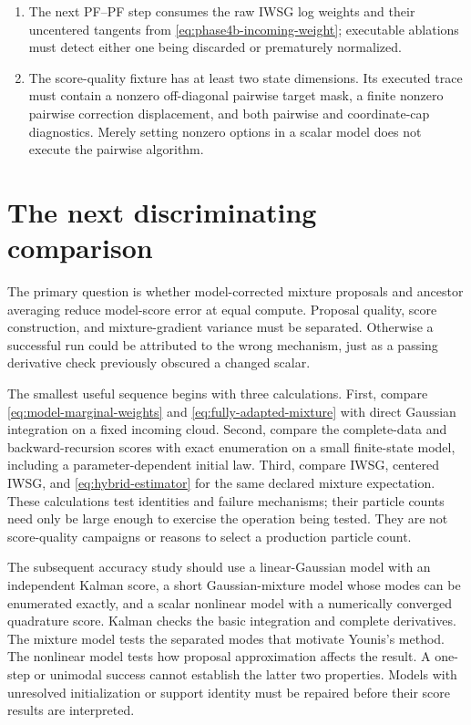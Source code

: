 \documentclass[11pt]{article}
\begin{document}
\begin{enumerate}[leftmargin=2em]
        evidence.
  \item The next PF--PF step consumes the raw IWSG log weights and their
        uncentered tangents from \eqref{eq:phase4b-incoming-weight}; executable
        ablations must detect either one being discarded or prematurely
        normalized.
  \item The score-quality fixture has at least two state dimensions.  Its
        executed trace must contain a nonzero off-diagonal pairwise target mask,
        a finite nonzero pairwise correction displacement, and both pairwise and
        coordinate-cap diagnostics.  Merely setting nonzero options in a scalar
        model does not execute the pairwise algorithm.
\end{enumerate}

\section{The next discriminating comparison}
\label{sec:next-study}

The primary question is whether model-corrected mixture proposals and
ancestor averaging reduce model-score error at equal compute. Proposal
quality, score construction, and mixture-gradient variance must be separated.
Otherwise a successful run could be attributed to the wrong mechanism, just
as a passing derivative check previously obscured a changed scalar.

The smallest useful sequence begins with three calculations. First, compare
\eqref{eq:model-marginal-weights} and
\eqref{eq:fully-adapted-mixture} with direct Gaussian integration on a fixed
incoming cloud. Second, compare the complete-data and backward-recursion
scores with exact enumeration on a small finite-state model, including a
parameter-dependent initial law. Third, compare IWSG, centered IWSG, and
\eqref{eq:hybrid-estimator} for the same declared mixture expectation.
These calculations test identities and failure mechanisms; their particle
counts need only be large enough to exercise the operation being tested.
They are not score-quality campaigns or reasons to select a production
particle count.

The subsequent accuracy study should use a linear-Gaussian model with an
independent Kalman score, a short Gaussian-mixture model whose modes can be
enumerated exactly, and a scalar nonlinear model with a numerically converged
quadrature score. Kalman checks the basic integration and complete derivatives.
The mixture model tests the separated modes that motivate Younis's method.
The nonlinear model tests how proposal approximation affects the result.
A one-step or unimodal success cannot establish the latter two properties.
Models with unresolved initialization or support identity must be repaired
before their score results are interpreted.
\end{document}
